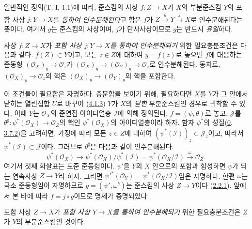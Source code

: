 \begin{env}[4.1.8]
\label{I.4.1.8-ko}
일반적인 정의(T, I, 1.1)에 따라, 준스킴의 사상 $f:Z\to X$가
$X$의 부분준스킴 $Y$의 포함 사상 $j:Y\to X$를 \emph{통하여
인수분해된다}고 함은
$f$가 $Z\xrightarrow{g}Y\xrightarrow{j}X$로 인수분해된다는 뜻이다.
여기서 $g$는 준스킴의 사상이며, $j$가 단사사상이므로 $g$는 반드시
\emph{유일}하다.
\end{env}

\begin{proposition}[4.1.9]
\label{I.4.1.9-ko}
사상 $f:Z\to X$가 \emph{포함 사상 $j:Y\to X$를 통하여
인수분해되기} 위한 필요충분조건은 다음과 같다. $f(Z)\subset Y$이고,
모든 $z\in Z$에 대하여 $y=f(z)$로 놓으면 $f$에 대응하는 준동형
$(\mathscr{O}_X)_y\to\mathscr{O}_z$가
$(\mathscr{O}_X)_y\to(\mathscr{O}_Y)_y\to\mathscr{O}_z$로
인수분해된다. 동치로, $(\mathscr{O}_X)_y\to\mathscr{O}_z$의 핵은
$(\mathscr{O}_X)_y\to(\mathscr{O}_Y)_y$의 핵을 포함한다.
\end{proposition}

이 조건들이 필요함은 자명하다. 충분함을 보이기 위해, 필요하다면
$X$를 $Y$가 그 안에서 닫히는 열린집합 $U$로 바꾸어
(\hyperref[I.4.1.3-ko]{4.1.3}) $Y$가 $X$의 \emph{닫힌}
부분준스킴인 경우로 귀착할 수 있다. 이때 $Y$는
$\mathscr{O}_X$의 준연접 아이디얼층 $\mathscr{I}$에 의해 정의된다.
$f=(\psi,\theta)$로 놓고, $\mathscr{J}$를
$\theta^\sharp:\psi^*(\mathscr{O}_X)\to\mathscr{O}_Z$의 핵인
$\psi^*(\mathscr{O}_X)$의 아이디얼층이라 하자. 함자 $\psi^*$의
성질(\hyperref[0.3.7.2-ko]{0, 3.7.2})을 고려하면, 가정에 따라 모든
$z\in Z$에 대하여
$(\psi^*(\mathscr{I}))_z\subset\mathscr{J}_z$이고, 따라서
$\psi^*(\mathscr{I})\subset\mathscr{J}$이다. 그러므로
$\theta^\sharp$은 다음과 같이 인수분해된다.
\[
  \psi^*(\mathscr{O}_X)\longrightarrow
  \psi^*(\mathscr{O}_X)/\psi^*(\mathscr{I})
  =\psi^*(\mathscr{O}_X/\mathscr{I})
  \xrightarrow{\omega}\mathscr{O}_Z.
\]
여기서 첫째 화살표는 표준 준동형이다. $\psi'$을 $Y$의 $X$ 안으로의
포함과 합성하면 $\psi$가 되는 연속사상 $Z\to Y$라 하자. 그러면
${\psi'}^*(\mathscr{O}_Y)=\psi^*(\mathscr{O}_X/\mathscr{I})$임은
자명하다. 한편 $\omega$는 국소 준동형임이 자명하므로
$g=(\psi',\omega^b)$는 준스킴의 사상 $Z\to Y$이다
(\hyperref[I.2.2.1-ko]{2.2.1}). 앞에서 본 바에 따라 $f=j\circ g$이므로
명제가 증명되었다.

\begin{corollary}[4.1.10]
\label{I.4.1.10-ko}
포함 사상 $Z\to X$가 \emph{포함 사상 $Y\to X$를 통하여
인수분해되기} 위한 필요충분조건은 $Z$가 $Y$의 부분준스킴인 것이다.
\end{corollary}

